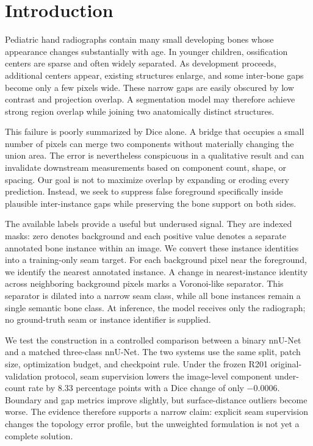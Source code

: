 \section{Introduction}

Pediatric hand radiographs contain many small developing bones whose appearance changes substantially with age. In younger children, ossification centers are sparse and often widely separated. As development proceeds, additional centers appear, existing structures enlarge, and some inter-bone gaps become only a few pixels wide. These narrow gaps are easily obscured by low contrast and projection overlap. A segmentation model may therefore achieve strong region overlap while joining two anatomically distinct structures.

This failure is poorly summarized by Dice alone. A bridge that occupies a small number of pixels can merge two components without materially changing the union area. The error is nevertheless conspicuous in a qualitative result and can invalidate downstream measurements based on component count, shape, or spacing. Our goal is not to maximize overlap by expanding or eroding every prediction. Instead, we seek to suppress false foreground specifically inside plausible inter-instance gaps while preserving the bone support on both sides.

The available labels provide a useful but underused signal. They are indexed masks: zero denotes background and each positive value denotes a separate annotated bone instance within an image. We convert these instance identities into a training-only seam target. For each background pixel near the foreground, we identify the nearest annotated instance. A change in nearest-instance identity across neighboring background pixels marks a Voronoi-like separator. This separator is dilated into a narrow seam class, while all bone instances remain a single semantic bone class. At inference, the model receives only the radiograph; no ground-truth seam or instance identifier is supplied.

We test the construction in a controlled comparison between a binary nnU-Net \citep{isensee2021nnunet} and a matched three-class nnU-Net. The two systems use the same split, patch size, optimization budget, and checkpoint rule. Under the frozen R201 original-validation protocol, seam supervision lowers the image-level component under-count rate by 8.33 percentage points with a Dice change of only $-0.0006$. Boundary and gap metrics improve slightly, but surface-distance outliers become worse. The evidence therefore supports a narrow claim: explicit seam supervision changes the topology error profile, but the unweighted formulation is not yet a complete solution.

